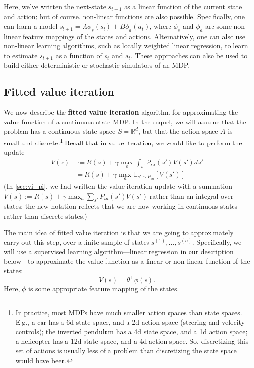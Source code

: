 Here, we've written the next-state $s_{t+1}$ as a linear function of the current
state and action; but of course, non-linear functions are also possible.
Specifically, one can learn a model $s_{t+1} = A\phi_s(s_t) + B\phi_a(a_t)$, where $\phi_s$ and $\phi_a$ are
some non-linear feature mappings of the states and actions. Alternatively,
one can also use non-linear learning algorithms, such as locally weighted
linear regression, to learn to estimate $s_{t+1}$ as a function of $s_t$ and $a_t$. These
approaches can also be used to build either deterministic or stochastic
simulators of an MDP.


\subsection{Fitted value iteration}
We now describe the \textbf{fitted value iteration} algorithm for approximating
the value function of a continuous state MDP. In the sequel, we will assume
that the problem has a continuous state space $S = \mathbb R^d$, but that the action
space $A$ is small and discrete.\footnote{
In practice, most MDPs have much smaller action spaces than state spaces. E.g., a car
has a 6d state space, and a 2d action space (steering and velocity controls); the inverted
pendulum has a 4d state space, and a 1d action space; a helicopter has a 12d state space,
and a 4d action space. So, discretizing this set of actions is usually less of a problem than
discretizing the state space would have been.}
Recall that in value iteration, we would like to perform the update
\begin{align}
    V(s) &:= R(s) + \gamma \max_a \int_{s'} P_{sa}(s')V(s')ds' \label{eq:vi_continuous}\\
         &= R(s) + \gamma \max_a \mathbb E_{s'\sim P_{sa}}[V(s')]\label{eq:vi_continuous_expectation}
\end{align}
(In \cref{sec:vi_pi}, we had written the value iteration update with a summation
$V(s) := R(s) + \gamma \max_a \sum_{s'} P_{sa}(s')V(s')$ rather than an integral over states;
the new notation reflects that we are now working in continuous states rather
than discrete states.)

The main idea of fitted value iteration is that we are going to
approximately carry out this step, over a finite sample of states $s^{(1)},\ldots,s^{(n)}$.
Specifically, we will use a supervised learning algorithm---linear regression in our
description below---to approximate the value function as a linear or
non-linear function of the states:
\[
    V(s) = \theta^\top \phi(s).
\]
Here, $\phi$ is some appropriate feature mapping of the states.


